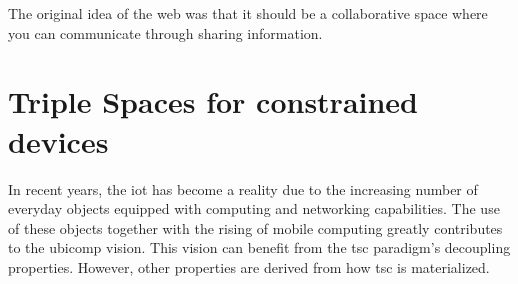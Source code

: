 
\begin{savequote}[50mm]
The original idea of the web was that it should be a collaborative space where you can communicate through sharing information.
\end{savequote}


\newcommand{\codigo}[1]{``\texttt{#1}''}
\newcommand{\primquery}{\emph{query}}
\newcommand{\primread}{\emph{read}}
\newcommand{\primtake}{\emph{take}}
\newcommand{\primwrite}{\emph{write}}

\newcommand{\coordspace}{\emph{coordination space}}
\newcommand{\outerspace}{\emph{outer space}}
\newcommand{\coordinator}{\emph{coordinator}}
\newcommand{\coordinators}{\emph{coordinators}}
\newcommand{\asteroids}{\emph{asteroids}}
\newcommand{\asteroid}{\emph{asteroid}}
\newcommand{\selfgraphs}{\emph{self-managed graphs}}
\newcommand{\osapi}{\emph{OSAPI}}


\chapter{Triple Spaces for constrained devices}
\label{cha:tsc}

\ifpdf
    \graphicspath{{\pathchapfour/figures/PNG/}{\pathchapfour/figures/PDF/}{\pathchapfour/figures/}}
\else
    \graphicspath{{\pathchapfour/figures/EPS/}{\pathchapfour/figures/}}
\fi









In recent years, the \acf{iot} has become a reality due to the increasing number of everyday objects equipped with computing and networking capabilities.
The use of these objects together with the rising of mobile computing greatly contributes to the \ac{ubicomp} vision.
This vision can benefit from the \acf{tsc} paradigm's decoupling properties. %
However, other properties are derived from how \ac{tsc} is materialized. %


